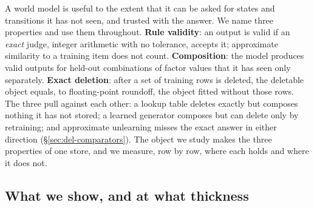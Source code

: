 \documentclass{article}
\begin{document}
A world model is useful to the extent that it can be asked for states and transitions it
has not seen, and trusted with the answer. We name three properties and use them throughout.
\textbf{Rule validity}: an output is valid if an \emph{exact} judge, integer arithmetic with
no tolerance, accepts it; approximate similarity to a training item does not count.
\textbf{Composition}: the model produces valid outputs for held-out combinations of factor
values that it has seen only separately. \textbf{Exact deletion}: after a set of training rows
is deleted, the deletable object equals, to floating-point roundoff, the object fitted without
those rows. The three pull against each other: a lookup table deletes exactly but composes
nothing it has not stored; a learned generator composes but can delete only by retraining; and
approximate unlearning misses the exact answer in either direction (\S\ref{sec:del-comparators}).
The object we study makes the three properties of one store, and we measure, row by row, where each
holds and where it does not.

\subsection{What we show, and at what thickness}
\label{sec:contrib}
\end{document}
